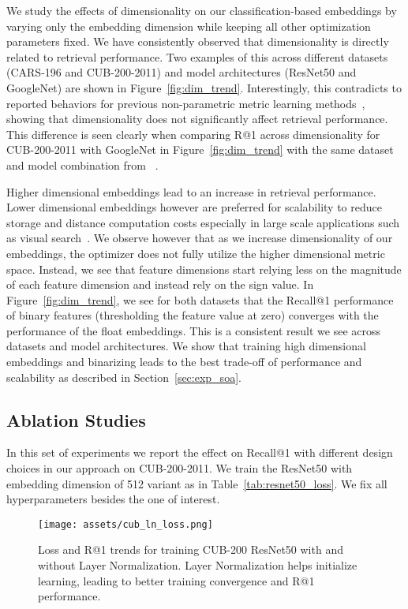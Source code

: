 \documentclass{bmvc2k}
\begin{document}
We study the effects of dimensionality on our classification-based embeddings by varying only the embedding dimension while keeping all other optimization parameters fixed. We have consistently observed that dimensionality is directly related to retrieval performance. Two examples of this across different datasets (CARS-196 and CUB-200-2011) and model architectures (ResNet50 and GoogleNet) are shown in Figure~\ref{fig:dim_trend}. Interestingly, this contradicts to reported behaviors for previous non-parametric metric learning methods~\cite{angular,songCVPR16,songCVPR17}, showing that dimensionality does not significantly affect retrieval performance. This difference is seen clearly when comparing R@1 across dimensionality for CUB-200-2011 with GoogleNet in Figure~\ref{fig:dim_trend} with the same dataset and model combination from ~\cite{songCVPR16}.

Higher dimensional embeddings lead to an increase in retrieval performance. Lower dimensional embeddings however are preferred for scalability to reduce storage and distance computation costs especially in large scale applications such as visual search~\cite{jing15}. We observe however that as we increase dimensionality of our embeddings, the optimizer does not fully utilize the higher dimensional metric space. Instead, we see that feature dimensions start relying less on the magnitude of each feature dimension and instead rely on the sign value. In Figure~\ref{fig:dim_trend}, we see for both datasets that the Recall@1 performance of binary features (thresholding the feature value at zero) converges with the performance of the float embeddings. This is a consistent result we see across datasets and model architectures. We show that training high dimensional embeddings and binarizing leads to the best trade-off of performance and scalability as described in Section~\ref{sec:exp_soa}. \subsection{Ablation Studies}
\label{sec:ablation}

In this set of experiments we report the effect on Recall@1 with different design choices in our approach on CUB-200-2011. We train the ResNet50 with embedding dimension of 512 variant as in Table~\ref{tab:resnet50_loss}. We fix all hyperparameters besides the one of interest.

\begin{figure}
\centering
  \texttt{[image: assets/cub\_ln\_loss.png]}
   \caption{Loss and R@1 trends for training CUB-200 ResNet50 with and without Layer Normalization. Layer Normalization helps initialize learning, leading to better training convergence and R@1 performance.}
   \label{sec:label_norm_exp}

\end{figure}
\end{document}
